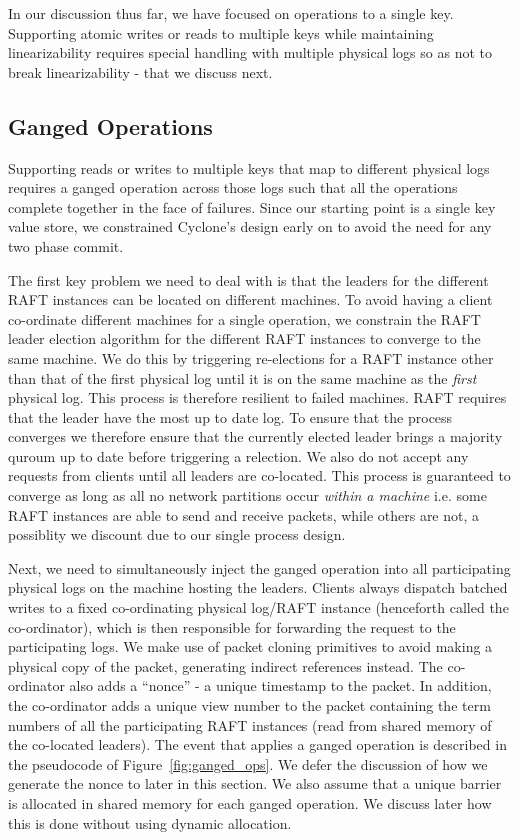 \documentclass[pageno]{jpaper}
\begin{document}
In our discussion thus far, we have focused on operations to a single
key. Supporting atomic writes or reads to multiple keys while maintaining
linearizability requires special handling with multiple physical logs so as not
to break linearizability - that we discuss next.

\subsection{Ganged Operations}
Supporting reads or writes to multiple keys that map to different physical logs
requires a ganged operation across those logs such that all the operations
complete together in the face of failures. Since our starting point is a single
key value store, we constrained Cyclone's design early on to avoid the need for
any two phase commit.

The first key problem we need to deal with is that the leaders for the different
RAFT instances can be located on different machines. To avoid having a client
co-ordinate different machines for a single operation, we constrain the RAFT
leader election algorithm for the different RAFT instances to converge to the
same machine. We do this by triggering re-elections for a RAFT instance other
than that of the first physical log until it is on the same machine as the
\emph{first} physical log. This process is therefore resilient to failed
machines. RAFT requires that the leader have the most up to date log. To ensure
that the process converges we therefore ensure that the currently elected leader
brings a majority quroum up to date before triggering a relection. We also do
not accept any requests from clients until all leaders are co-located. This
process is guaranteed to converge as long as all no network partitions occur
\emph{within a machine} i.e. some RAFT instances are able to send and receive
packets, while others are not, a possiblity we discount due to our single
process design.

Next, we need to simultaneously inject the ganged operation into all
participating physical logs on the machine hosting the leaders. Clients always
dispatch batched writes to a fixed co-ordinating physical log/RAFT instance
(henceforth called the co-ordinator), which is then responsible for forwarding
the request to the participating logs. We make use of packet cloning primitives
to avoid making a physical copy of the packet, generating indirect references
instead. The co-ordinator also adds a ``nonce'' - a unique timestamp to the
packet. In addition, the co-ordinator adds a unique view number to the packet
containing the term numbers of all the participating RAFT instances (read from
shared memory of the co-located leaders).  The event that applies a ganged
operation is described in the pseudocode of Figure~\ref{fig:ganged_ops}. We
defer the discussion of how we generate the nonce to later in this section. We
also assume that a unique barrier is allocated in shared memory for each ganged
operation. We discuss later how this is done without using dynamic allocation.
\end{document}
